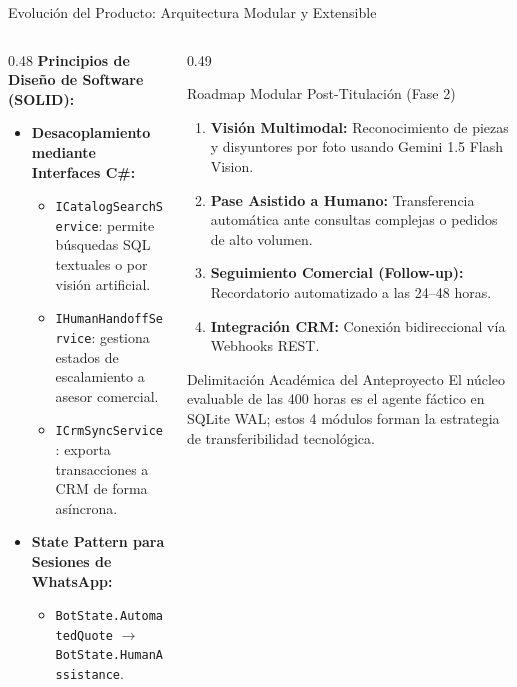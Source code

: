 \documentclass[aspectratio=169, 10pt]{beamer}
\begin{document}
\begin{frame}{Evolución del Producto: Arquitectura Modular y Extensible}
  \begin{columns}[t]
    \begin{column}{0.48\textwidth}
      \textbf{Principios de Diseño de Software (SOLID):}
      \begin{itemize}\footnotesize\setlength{\itemsep}{2pt}
        \item \textbf{Desacoplamiento mediante Interfaces C\#:}
          \begin{itemize}\scriptsize
            \item \texttt{ICatalogSearchService}: permite búsquedas SQL textuales o por visión artificial.
            \item \texttt{IHumanHandoffService}: gestiona estados de escalamiento a asesor comercial.
            \item \texttt{ICrmSyncService}: exporta transacciones a CRM de forma asíncrona.
          \end{itemize}
        \item \textbf{State Pattern para Sesiones de WhatsApp:}
          \begin{itemize}\scriptsize
            \item \texttt{BotState.AutomatedQuote} $\rightarrow$ \texttt{BotState.HumanAssistance}.
          \end{itemize}
      \end{itemize}
    \end{column}
    
    \begin{column}{0.49\textwidth}
      \begin{block}{Roadmap Modular Post-Titulación (Fase 2)}
        \scriptsize
        \begin{enumerate}\setlength{\itemsep}{1pt}
          \item \textbf{Visión Multimodal:} Reconocimiento de piezas y disyuntores por foto usando Gemini 1.5 Flash Vision.
          \item \textbf{Pase Asistido a Humano:} Transferencia automática ante consultas complejas o pedidos de alto volumen.
          \item \textbf{Seguimiento Comercial (Follow-up):} Recordatorio automatizado a las 24--48 horas.
          \item \textbf{Integración CRM:} Conexión bidireccional vía Webhooks REST.
        \end{enumerate}
      \end{block}
      
      \vspace{0.05cm}
      \begin{alertblock}{Delimitación Académica del Anteproyecto}
        \scriptsize
        El núcleo evaluable de las 400 horas es el agente fáctico en SQLite WAL; estos 4 módulos forman la estrategia de transferibilidad tecnológica.
      \end{alertblock}
    \end{column}
  \end{columns}
\end{frame}
\end{document}
